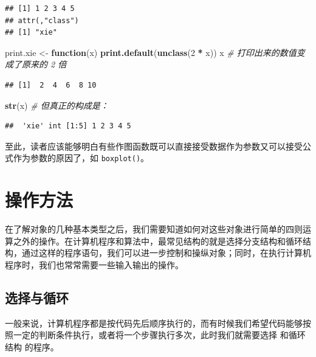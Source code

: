 \documentclass[
  b5paper,
  UTF8,twoside]{book}
\newenvironment{Shaded}{\begin{snugshade}}{\end{snugshade}}
\newcommand{\CommentTok}[1]{\textcolor[rgb]{0.56,0.35,0.01}{\textit{#1}}}
\newcommand{\ControlFlowTok}[1]{\textcolor[rgb]{0.13,0.29,0.53}{\textbf{#1}}}
\newcommand{\DecValTok}[1]{\textcolor[rgb]{0.00,0.00,0.81}{#1}}
\newcommand{\FunctionTok}[1]{\textcolor[rgb]{0.13,0.29,0.53}{\textbf{#1}}}
\newcommand{\NormalTok}[1]{#1}
\newcommand{\OtherTok}[1]{\textcolor[rgb]{0.56,0.35,0.01}{#1}}
\newcommand{\SpecialCharTok}[1]{\textcolor[rgb]{0.81,0.36,0.00}{\textbf{#1}}}
\begin{document}
\begin{verbatim}
## [1] 1 2 3 4 5
## attr(,"class")
## [1] "xie"
\end{verbatim}

\begin{Shaded}
\begin{Highlighting}[]
\NormalTok{print.xie }\OtherTok{\textless{}{-}} \ControlFlowTok{function}\NormalTok{(x) }\FunctionTok{print.default}\NormalTok{(}\FunctionTok{unclass}\NormalTok{(}\DecValTok{2} \SpecialCharTok{*}\NormalTok{ x))}
\NormalTok{x }\CommentTok{\# 打印出来的数值变成了原来的 2 倍}
\end{Highlighting}
\end{Shaded}

\begin{verbatim}
## [1]  2  4  6  8 10
\end{verbatim}

\begin{Shaded}
\begin{Highlighting}[]
\FunctionTok{str}\NormalTok{(x) }\CommentTok{\# 但真正的构成是：}
\end{Highlighting}
\end{Shaded}

\begin{verbatim}
##  'xie' int [1:5] 1 2 3 4 5
\end{verbatim}

至此，读者应该能够明白有些作图函数既可以直接接受数据作为参数又可以接受公式作为参数的原因了，如 \texttt{boxplot()}。

\section{操作方法}\label{ux64cdux4f5cux65b9ux6cd5}

在了解对象的几种基本类型之后，我们需要知道如何对这些对象进行简单的四则运算之外的操作。在计算机程序和算法中，最常见结构的就是选择分支结构和循环结构，通过这样的程序语句，我们可以进一步控制和操纵对象；同时，在执行计算机程序时，我们也常常需要一些输入输出的操作。

\subsection{选择与循环}\label{ux9009ux62e9ux4e0eux5faaux73af}

一般来说，计算机程序都是按代码先后顺序执行的，而有时候我们希望代码能够按照一定的判断条件执行，或者将一个步骤执行多次，此时我们就需要选择 和循环结构 的程序。
\end{document}
